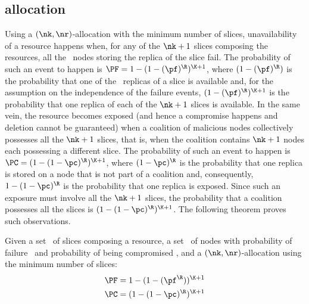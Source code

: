\subsection{\diagonal allocation}\label{dcs:sec:minslice}
Using a $(\nk,\nr)$-allocation with the minimum number of slices,
unavailability of a resource happens when, for any of the $\nk+1$
slices composing the resources, all the \nr\ nodes storing the replica
of the slice fail. The probability of such an event to happen is $\PF=
1 - (1-(\pf)^{\R})^{\K+1}$, where $(1-(\pf)^{\R})$ is the probability
that one of the \nr\ replicas of a slice is available and, for the
assumption on the independence of the failure events,
$(1-(\pf)^{\R})^{\K+1}$ is the probability that one replica of each of
the $\nk+1$ slices is available. In the same vein, the resource
becomes exposed (and hence a compromise happens and deletion cannot be
guaranteed) when a coalition of malicious nodes collectively possesses
all the $\nk+1$ slices, that is, when the coalition contains $\nk+1$
nodes each possessing a different slice. The probability of such an
event to happen is $\PC= (1 - (1-\pc)^{\R})^{\K+1}$, where
$(1-\pc)^{\R}$ is the probability that one replica is stored on a node
that is not part of a coalition and, consequently, $1-(1-\pc)^{\R}$ is
the probability that one replica is exposed. Since such an exposure
must involve all the $\nk+1$ slices, the probability that a coalition
possesses all the slices is $(1 - (1-\pc)^{\R})^{\K+1}$. The following
theorem proves such observations.

\smallskip
\begin{theorem}\label{dcs:teo:probability-diagonal}
Given a set \Shards\ of slices composing a resource, a set \Nodes\ of nodes with probability of failure \pf\ and probability of being compromised \pc, and a $(\nk,\nr)$-allocation using the minimum number of slices:
	\begin{align*}
	  & \PF = 1 - (1-(\pf^{\R}))^{\K+1} \\
	  & \PC = (1 -  (1-\pc)^{\R})^{\K+1}
	\end{align*} 
\end{theorem}
\smallskip



